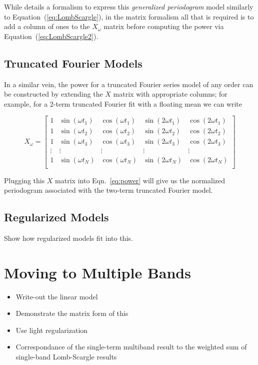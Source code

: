 \documentclass[12pt,preprint]{aastex}
\newcommand{\Eq}[1]{Equation~(\ref{eq:#1})}
\newcommand{\eq}[1]{\Eq{#1}}
\begin{document}
While \citep{Zechmeister09} details a formalism to express this {\it generalized periodogram} model similarly to \eq{LombScargle}, in the matrix formalism all that is required is to add a column of ones to the $X_\omega$ matrix before computing the power via \eq{LombScargle2}.

\subsection{Truncated Fourier Models}
In a similar vein, the power for a truncated Fourier series model of any order can be constructed by extending the $X$ matrix with appropriate columns; for example, for a 2-term truncated Fourier fit with a floating mean we can write

\begin{equation}
X_\omega = \left[
\begin{array}{ccccc}
1 & \sin(\omega t_1) & \cos(\omega t_1) & \sin(2\omega t_1) & \cos(2\omega t_1)\\
1 & \sin(\omega t_2) & \cos(\omega t_2) & \sin(2\omega t_2) & \cos(2\omega t_2)\\
1 & \sin(\omega t_3) & \cos(\omega t_3) & \sin(2\omega t_3) & \cos(2\omega t_3)\\
\vdots & \vdots & \vdots & \vdots & \vdots \\
1 & \sin(\omega t_N) & \cos(\omega t_N) & \sin(2\omega t_N) & \cos(2\omega t_N)\\
\end{array}
\right]
\end{equation}

Plugging this $X$ matrix into Eqn.~\ref{eq:power} will give us the normalized periodogram associated with the two-term truncated Fourier model.

\subsection{Regularized Models}

Show how regularized models fit into this.


\section{Moving to Multiple Bands}

\begin{itemize}
  \item Write-out the linear model
  \item Demonstrate the matrix form of this
  \item Use light regularization
  \item Correspondance of the single-term multiband result to the weighted sum of single-band Lomb-Scargle results
\end{itemize}
\end{document}
